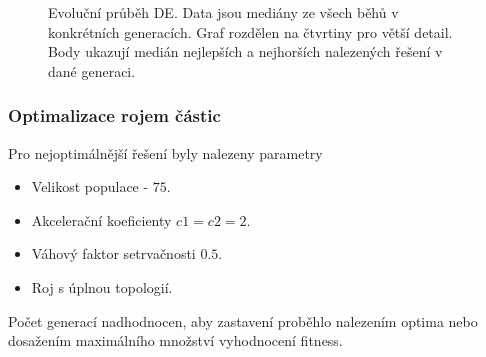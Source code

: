 \begin{figure}[H]
{\begin{tabular}{cc}
    \end{tabular}
    }
    \caption{Evoluční průběh DE. Data jsou mediány ze všech běhů v konkrétních generacích. Graf rozdělen na čtvrtiny pro větší detail. Body ukazují medián nejlepších a nejhorších nalezených řešení v dané generaci.}
    \label{fg:bench:griewank:de:evoProg}
\end{figure}

\subsubsection{Optimalizace rojem částic}
Pro nejoptimálnější řešení byly nalezeny parametry 
\begin{itemize}
    \item Velikost populace - $75$.
    \item Akcelerační koeficienty $c1 = c2 =2$.
    \item Váhový faktor setrvačnosti $0.5$.
    \item Roj s úplnou topologií.
\end{itemize}
Počet generací nadhodnocen, aby zastavení proběhlo nalezením optima nebo dosažením maximálního množství vyhodnocení fitness.

